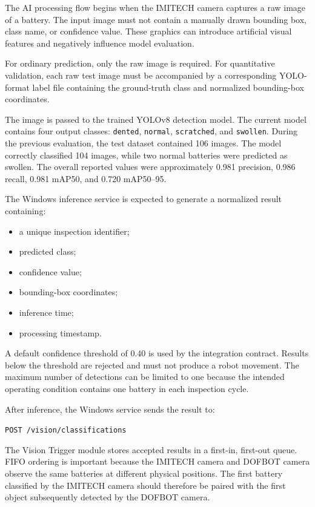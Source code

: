 The AI processing flow begins when the IMITECH camera captures a raw image of a battery. The input image must not contain a manually drawn bounding box, class name, or confidence value. These graphics can introduce artificial visual features and negatively influence model evaluation.

For ordinary prediction, only the raw image is required. For quantitative validation, each raw test image must be accompanied by a corresponding YOLO-format label file containing the ground-truth class and normalized bounding-box coordinates.

The image is passed to the trained YOLOv8 detection model. The current model contains four output classes: \texttt{dented}, \texttt{normal}, \texttt{scratched}, and \texttt{swollen}. During the previous evaluation, the test dataset contained 106 images. The model correctly classified 104 images, while two normal batteries were predicted as swollen. The overall reported values were approximately 0.981 precision, 0.986 recall, 0.981 mAP50, and 0.720 mAP50--95.

The Windows inference service is expected to generate a normalized result containing:

\begin{itemize}
    \item a unique inspection identifier;
    \item predicted class;
    \item confidence value;
    \item bounding-box coordinates;
    \item inference time;
    \item processing timestamp.
\end{itemize}

A default confidence threshold of 0.40 is used by the integration contract. Results below the threshold are rejected and must not produce a robot movement. The maximum number of detections can be limited to one because the intended operating condition contains one battery in each inspection cycle.

After inference, the Windows service sends the result to:

\begin{center}
    \texttt{POST /vision/classifications}
\end{center}

The Vision Trigger module stores accepted results in a first-in, first-out queue. FIFO ordering is important because the IMITECH camera and DOFBOT camera observe the same batteries at different physical positions. The first battery classified by the IMITECH camera should therefore be paired with the first object subsequently detected by the DOFBOT camera.


